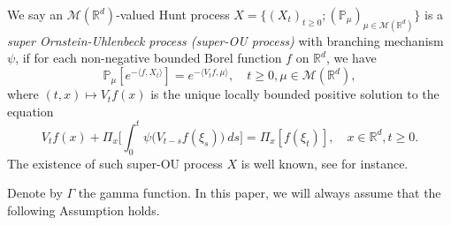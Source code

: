 \documentclass[12pt,a4paper]{amsart}
\theoremstyle{plain}
\theoremstyle{definition}
\numberwithin{equation}{section}
\begin{document}
    We say an $\mathcal M(\mathbb R^d)$-valued Hunt process $X = \{(X_t)_{t\geq 0}; (\mathbb{P}_{\mu})_{\mu \in \mathcal M(\mathbb R^d)}\}$ is a \emph{super Ornstein-Uhlenbeck process (super-OU process)} with branching mechanism $\psi$, if for each non-negative bounded Borel function $f$ on $\mathbb R^d$, we have
\begin{equation} 
    \mathbb{P}_{\mu}[e^{-\langle f,X_t \rangle}]
    = e^{-\langle V_tf, \mu \rangle},
    \quad t\geq 0, \mu \in \mathcal M(\mathbb R^d),
\end{equation}
	where $(t,x) \mapsto V_tf(x)$ is the unique locally bounded positive solution to the equation
\begin{equation} 
    V_tf(x) + \Pi_x \Big[ \int_0^t\psi\big(V_{t-s}f(\xi_s)\big)~ds\Big]
	= \Pi_x [f(\xi_t)],
    \quad x\in \mathbb R^d, t\geq 0.
\end{equation}	
    The existence of such super-OU process $X$ is well known, see \cite{Dynkin1993Superprocesses} for instance.
	
	Denote by $\Gamma$ the gamma function. 
	In this paper, we will always assume that the following Assumption holds.

\end{document}
